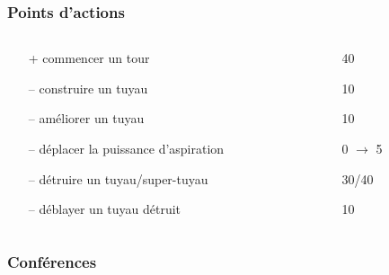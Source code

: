 \documentclass{beamer}
\begin{document}
\begin{frame}
	\frametitle{Points d'actions}
	\begin{columns}[T]
        \begin{column}{.65\textwidth}
            \begin{itemize}
	            \item[+] commencer un tour
	            \item[\alert{--}] construire un tuyau
	            \item[\alert{--}] améliorer un tuyau
	            \item[\alert{--}] déplacer la puissance d'aspiration
	            \item[\alert{--}] détruire un tuyau/super-tuyau
	            \item[\alert{--}] déblayer un tuyau détruit
	        \end{itemize}
        \end{column}
        \begin{column}{.35\textwidth}
            \begin{itemize}
                \item[] 40
	            \item[] 10
	            \item[] 10
	            \item[] 0 $\rightarrow$ 5
	            \item[] 30/40
	            \item[] 10
            \end{itemize}
        \end{column}
    \end{columns}
\end{frame}

\begin{frame}
    \frametitle{Conférences}
\end{frame}
\end{document}
